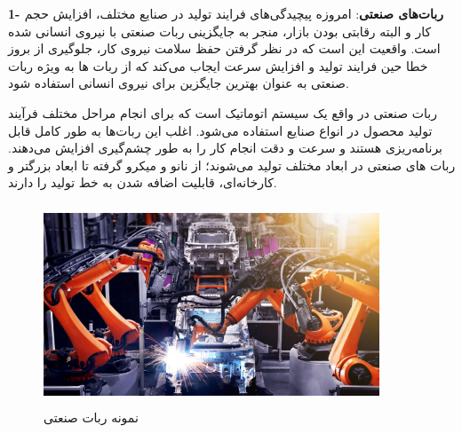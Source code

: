 \vspace{0.5cm}
\textbf{1- ربات‌های صنعتی}:
  امروزه پیچیدگی‌های فرایند تولید در صنایع مختلف، افزایش حجم کار و البته رقابتی بودن بازار، منجر به جایگزینی ربات صنعتی با نیروی انسانی شده است. واقعیت این است که در نظر گرفتن حفظ سلامت نیروی کار، جلوگیری از بروز خطا حین فرایند تولید و افزایش سرعت ایجاب می‌کند که از ربات ها به ویژه ربات صنعتی به عنوان بهترین جایگزین برای نیروی انسانی استفاده شود.
  
  ربات صنعتی در واقع یک سیستم اتوماتیک است که برای انجام مراحل مختلف فرآیند تولید محصول در انواع صنایع استفاده می‌شود. اغلب این ربات‌ها به طور کامل قابل برنامه‌ریزی هستند و سرعت و دقت انجام کار را به طور چشم‌گیری افزایش می‌دهند. ربات های صنعتی در ابعاد مختلف تولید می‌شوند؛ از نانو و میکرو گرفته تا ابعاد بزرگتر و کارخانه‌ای، قابلیت اضافه شدن به خط تولید را دارند.
    \begin{figure}[!h]
  	\vspace{0.2cm}
  	\centering
  	\includegraphics[height=6cm,width=10cm]{./Images/CH1/industrial_robot.jpg}
  	\caption{نمونه ربات صنعتی}
  	\label{ربات سنعتی}
    \end{figure}


